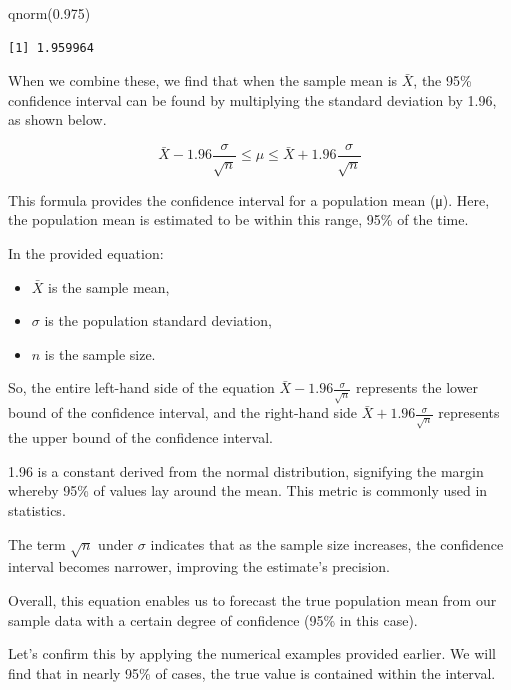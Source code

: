 \documentclass[
  a4paper,
]{book}
\newenvironment{Shaded}{\begin{snugshade}}{\end{snugshade}}
\newcommand{\FloatTok}[1]{\textcolor[rgb]{0.68,0.00,0.00}{#1}}
\newcommand{\FunctionTok}[1]{\textcolor[rgb]{0.28,0.35,0.67}{#1}}
\newcommand{\NormalTok}[1]{\textcolor[rgb]{0.00,0.23,0.31}{#1}}
\providecommand{\tightlist}{%
  \setlength{\itemsep}{0pt}\setlength{\parskip}{0pt}}\usepackage{longtable,booktabs,array}
\begin{document}
\begin{Shaded}
\begin{Highlighting}[]
\FunctionTok{qnorm}\NormalTok{(}\FloatTok{0.975}\NormalTok{)}
\end{Highlighting}
\end{Shaded}

\begin{verbatim}
[1] 1.959964
\end{verbatim}

When we combine these, we find that when the sample mean is \(\bar{X}\),
the 95\% confidence interval can be found by multiplying the standard
deviation by 1.96, as shown below.

\[ \bar{X} - 1.96 \frac{\sigma}{\sqrt{n}} \le \mu \le \bar{X} + 1.96 \frac{\sigma}{\sqrt{n}} \]

This formula provides the confidence interval for a population mean (μ).
Here, the population mean is estimated to be within this range, 95\% of
the time.

In the provided equation:

\begin{itemize}
\tightlist
\item
  \(\bar{X}\) is the sample mean,
\item
  \({\sigma}\) is the population standard deviation,
\item
  \(n\) is the sample size.
\end{itemize}

So, the entire left-hand side of the equation
\(\bar{X} - 1.96 \frac{\sigma}{\sqrt{n}}\) represents the lower bound of
the confidence interval, and the right-hand side
\(\bar{X} + 1.96 \frac{\sigma}{\sqrt{n}}\) represents the upper bound of
the confidence interval.

1.96 is a constant derived from the normal distribution, signifying the
margin whereby 95\% of values lay around the mean. This metric is
commonly used in statistics.

The term \(\sqrt{n}\) under \({\sigma}\) indicates that as the sample
size increases, the confidence interval becomes narrower, improving the
estimate's precision.

Overall, this equation enables us to forecast the true population mean
from our sample data with a certain degree of confidence (95\% in this
case).

Let's confirm this by applying the numerical examples provided earlier.
We will find that in nearly 95\% of cases, the true value is contained
within the interval.
\end{document}
